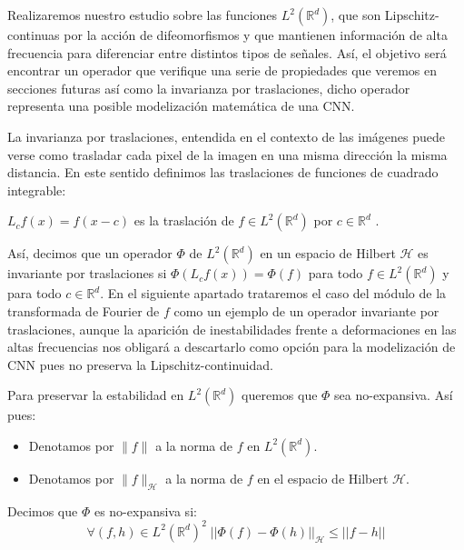 \medskip


\noindent Realizaremos nuestro estudio sobre las funciones $L^2(\mathbb{R}^d)$, que son Lipschitz-continuas por la acción de difeomorfismos y que mantienen información de alta frecuencia para diferenciar entre distintos tipos de señales. Así, el objetivo será encontrar un operador que verifique una serie de propiedades que veremos en secciones futuras así como la invarianza por traslaciones, dicho operador representa una posible modelización matemática de una CNN.

\medskip

\noindent La invarianza por traslaciones, entendida en el contexto de las imágenes puede verse como trasladar cada pixel de la imagen en una misma dirección la misma distancia. En este sentido definimos las traslaciones de funciones de cuadrado integrable: 

\begin{definicion}
$L_cf(x)=f(x-c)$ es la traslación de $f \in L^2(\mathbb{R}^d)$ por $c \in \mathbb{R}^d$ .
\end{definicion}

\medskip

\noindent Así, decimos que un operador $\Phi$ de  $L^2(\mathbb{R}^d)$ en un espacio de Hilbert $\mathcal{H}$ es invariante por traslaciones si $\Phi(L_cf(x))=\Phi(f)$ para todo $f \in L^2(\mathbb{R}^d)$ y para todo $c \in \mathbb{R}^d$. En el siguiente apartado trataremos el caso del módulo de la transformada de Fourier de $f$ como un ejemplo de un operador invariante por traslaciones, aunque la aparición de inestabilidades frente a deformaciones en las altas frecuencias nos obligará a descartarlo como opción para la modelización de CNN pues no preserva la Lipschitz-continuidad.

\medskip

\noindent Para preservar la estabilidad en $L^2(\mathbb{R}^d)$ queremos que $\Phi$ sea no-expansiva. Así pues: 

\begin{itemize}
  \item Denotamos por $\|f\|$ a la norma de $f$ en $L^2(\mathbb{R}^d)$.
  \item Denotamos por $\|f\|_\mathcal{H}$ a la norma de $f$ en el espacio de Hilbert $\mathcal{H}$.
\end{itemize}

\begin{definicion}
Decimos que $\Phi$ es no-expansiva si: 
$$\forall (f,h) \in L^2(\mathbb{R}^d)^2 \; || \Phi(f)-\Phi(h)||_\mathcal{H} \leq ||f-h||$$
\end{definicion}


